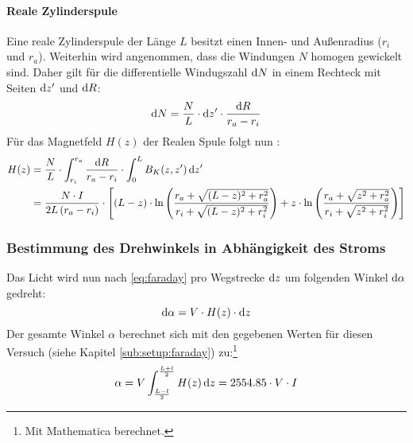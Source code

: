 \paragraph{Reale Zylinderspule}
Eine reale Zylinderspule der Länge $L$ besitzt einen Innen- und Außenradius ($r_i$ und $r_a$). 
Weiterhin wird angenommen, dass die Windungen $N$ homogen gewickelt sind. Daher gilt für die differentielle Windugszahl $\mathrm{d} N$ in einem 
Rechteck mit Seiten $\mathrm{d} z'$ und $\mathrm{d} R$:
\begin{equation}
  \mathrm{d} N = \frac{N}{L} \cdot \mathrm{d} z' \cdot \frac{\mathrm{d} R}{r_a - r_i}
\end{equation}
Für das Magnetfeld $H(z)$ der Realen Spule folgt nun \cite{herrmann}:
\begin{equation}
  \label{eq:hreal}
  \begin{split}
    H(z) &= \frac{N}{L} \cdot \int_{r_i}^{r_a} \frac{\mathrm{d} R}{r_a - r_i} \cdot \int_{0}^{L} B_K(z, z')\, \mathrm{d} z'\\
    &=\frac{N \cdot I}{2 L \left( r_a - r_i \right) } \cdot \left[ 
  	      (L-z) \cdot \ln \left( \frac{r_a + \sqrt{(L-z)^2  +r_a^2}}{r_i + \sqrt{(L-z)^2 + r_i^2}} \right) + 
  		  z \cdot \ln \left( \frac{r_a + \sqrt{z^2  +r_a^2}}{r_i + \sqrt{z^2 + r_i^2}} \right)  \right]
  \end{split}
\end{equation}
\subsubsection{Bestimmung des Drehwinkels in Abhängigkeit des Stroms}
\label{subsub:alpha}
Das Licht wird nun nach \autoref{eq:faraday} pro Wegstrecke $\mathrm{d} z$ um folgenden Winkel $\mathrm{d} \alpha$ gedreht:
\begin{equation}
  \mathrm{d} \alpha = V \cdot H(z) \cdot \mathrm{d} z
\end{equation}
Der gesamte Winkel $\alpha$ berechnet sich mit den gegebenen Werten für diesen Versuch (siehe Kapitel \ref{sub:setup:faraday}) 
zu:\footnote{Mit Mathematica berechnet.}
\begin{equation}
  \label{eq:verdet}
  \alpha = V \int_{\frac{L-l}{2}}^{\frac{L+l}{2}} H(z)\, \mathrm{d} z = 2554.85 \cdot V \cdot I 
\end{equation}